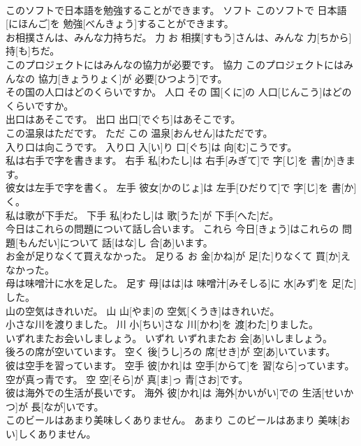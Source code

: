 \documentclass[8pt]{extreport}
\begin{document}
\begin{CJK}{UTF8}{min}
\\	このソフトで日本語を勉強することができます。	ソフト	このソフトで 日本語[にほんご]を 勉強[べんきょう]することができます。	
\\	お相撲さんは、みんな力持ちだ。	力	お 相撲[すもう]さんは、みんな 力[ちから] 持[も]ちだ。	
\\	このプロジェクトにはみんなの協力が必要です。	協力	このプロジェクトにはみんなの 協力[きょうりょく]が 必要[ひつよう]です。	
\\	その国の人口はどのくらいですか。	人口	その 国[くに]の 人口[じんこう]はどのくらいですか。	
\\	出口はあそこです。	出口	出口[でぐち]はあそこです。	
\\	この温泉はただです。	ただ	この 温泉[おんせん]はただです。	
\\	入り口は向こうです。	入り口	入[い]り 口[ぐち]は 向[む]こうです。	
\\	私は右手で字を書きます。	右手	私[わたし]は 右手[みぎて]で 字[じ]を 書[か]きます。	
\\	彼女は左手で字を書く。	左手	彼女[かのじょ]は 左手[ひだりて]で 字[じ]を 書[か]く。	
\\	私は歌が下手だ。	下手	私[わたし]は 歌[うた]が 下手[へた]だ。	
\\	今日はこれらの問題について話し合います。	これら	今日[きょう]はこれらの 問題[もんだい]について 話[はな]し 合[あ]います。	
\\	お金が足りなくて買えなかった。	足りる	お 金[かね]が 足[た]りなくて 買[か]えなかった。	
\\	母は味噌汁に水を足した。	足す	母[はは]は 味噌汁[みそしる]に 水[みず]を 足[た]した。	
\\	山の空気はきれいだ。	山	山[やま]の 空気[くうき]はきれいだ。	
\\	小さな川を渡りました。	川	小[ちい]さな 川[かわ]を 渡[わた]りました。	
\\	いずれまたお会いしましょう。	いずれ	いずれまたお 会[あ]いしましょう。	
\\	後ろの席が空いています。	空く	後[うし]ろの 席[せき]が 空[あ]いています。	
\\	彼は空手を習っています。	空手	彼[かれ]は 空手[からて]を 習[なら]っています。	
\\	空が真っ青です。	空	空[そら]が 真[ま]っ 青[さお]です。	
\\	彼は海外での生活が長いです。	海外	彼[かれ]は 海外[かいがい]での 生活[せいかつ]が 長[なが]いです。	
\\	このビールはあまり美味しくありません。	あまり	このビールはあまり 美味[おい]しくありません。	

\end{CJK}
\end{document}
